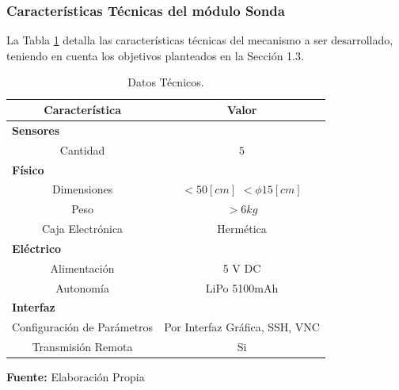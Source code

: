 \subsubsection[Características Técnicas de los módulos]{Características Técnicas del módulo Sonda}
La Tabla \ref{tab:carac_general2} detalla las características técnicas del mecanismo a ser desarrollado, teniendo en cuenta los objetivos planteados en la Sección 1.3.

\begin{table}[ht]
    \caption[Datos Técnicos]{Datos Técnicos.}
    \label{tab:carac_general2} 
    \centering
    {\begin{tabular}{c c}
        \textbf{Característica} & \textbf{Valor}  \\
        \hline
        \multicolumn{2}{l}{\textbf{Sensores}} \\
        Cantidad & $ 5 $   \\
        \multicolumn{2}{l}{\textbf{Físico}} \\
        Dimensiones & $< 50 [cm]$  $< \phi 15[cm]$   \\
        Peso &  $ > 6 kg$ \\
        Caja Electrónica & Herm\'etica  \\
        \multicolumn{2}{l}{\textbf{Eléctrico}} \\
         Alimentación & 5 V DC  \\
         Autonomía & LiPo 5100mAh  \\
         \multicolumn{2}{l}{\textbf{Interfaz}} \\
         Configuración de Parámetros & Por Interfaz Gráfica, SSH, VNC  \\
         Transmisi\'on Remota  & Si  \\
        \hline
    \end{tabular}}
    \vspace{5mm}
    \newline
    \hfill \textbf{Fuente:} Elaboración Propia
\end{table}
